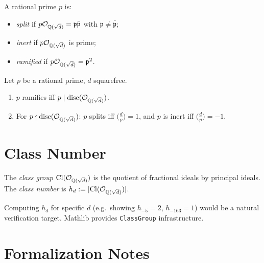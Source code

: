 \begin{definition}\label{def:plan_splitting}
  \notready
  A rational prime $p$ is:
  \begin{itemize}
    \item \emph{split} if $p\mathcal{O}_{\mathbb{Q}(\sqrt{d})} = \mathfrak{p}\bar{\mathfrak{p}}$
      with $\mathfrak{p}\ne\bar{\mathfrak{p}}$;
    \item \emph{inert} if $p\mathcal{O}_{\mathbb{Q}(\sqrt{d})}$ is prime;
    \item \emph{ramified} if $p\mathcal{O}_{\mathbb{Q}(\sqrt{d})} = \mathfrak{p}^2$.
  \end{itemize}
\end{definition}

\begin{theorem}
  \label{thm:plan_splitting_criterion}
  \notready
  Let $p$ be a rational prime, $d$ squarefree.
  \begin{enumerate}
    \item $p$ ramifies iff $p\mid\operatorname{disc}(\mathcal{O}_{\mathbb{Q}(\sqrt{d})})$.
    \item For $p\nmid\operatorname{disc}(\mathcal{O}_{\mathbb{Q}(\sqrt{d})})$: $p$ splits iff
      $\bigl(\frac{d}{p}\bigr) = 1$, and $p$ is inert iff
      $\bigl(\frac{d}{p}\bigr) = -1$.
  \end{enumerate}
\end{theorem}

\section{Class Number}

\begin{definition}\label{def:plan_class_group}
  \notready
  The \emph{class group} $\mathrm{Cl}(\mathcal{O}_{\mathbb{Q}(\sqrt{d})})$ is the quotient of
  fractional ideals by principal ideals.  The \emph{class number}
  is $h_d := |\mathrm{Cl}(\mathcal{O}_{\mathbb{Q}(\sqrt{d})})|$.
\end{definition}

\begin{remark}
  Computing $h_d$ for specific $d$ (e.g.\ showing $h_{-5}=2$,
  $h_{-163}=1$) would be a natural verification target.
  Mathlib provides \texttt{ClassGroup} infrastructure.
\end{remark}

\section{Formalization Notes}

